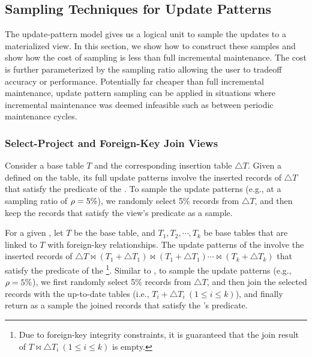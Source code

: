 \subsection{Sampling Techniques for Update Patterns}\label{subsec:sample-pattern}
The update-pattern model gives us a logical unit to sample the updates to a materialized view.
In this section, we show how to construct these samples and show how the cost of sampling is less than full incremental maintenance.
The cost is further parameterized by the sampling ratio allowing the user to tradeoff accuracy or performance.
Potentially far cheaper than full incremental maintenance, update pattern sampling can be applied in situations where incremental maintenance was deemed infeasible such as between periodic maintenance cycles.

\subsubsection{Select-Project and Foreign-Key Join Views}
Consider a base table $T$ and the corresponding insertion table $\triangle T$. Given a \spview defined on the table, its full update patterns involve the inserted records of $\triangle T$ that satisfy the predicate of the \spview. To sample the update patterns (e.g., at a sampling ratio of $\rho  = 5 \%$), we randomly select 5\% records from $\triangle T$, and then keep the records that satisfy the view's predicate as a sample. 

\sloppy

For a given \fjview, let $T$ be the base table, and $T_1, T_2, \cdots, T_k$ be base tables that are linked to $T$ with foreign-key relationships. The update patterns of the \fjview involve the inserted records of $\triangle T \bowtie (T_1+\triangle T_1) \bowtie (T_1+\triangle T_1) \cdots \bowtie (T_k+\triangle T_k)$ that satisfy the predicate of the \fjview\footnote{\scriptsize Due to foreign-key integrity constraints, it is guaranteed that the join result of $T \bowtie \triangle T_i ~(1\leq i \leq k)$ is empty.}. Similar to \spview, to sample the update patterns (e.g., $\rho = 5 \%$), we first randomly select 5\% records from $\triangle T$, and then join the selected records with the up-to-date tables (i.e., $T_i + \triangle T_i ~(1\leq i \leq k)$), and finally return as a sample the joined records that satisfy the \fjview's predicate. 

\fussy



\vspace{.5em}


